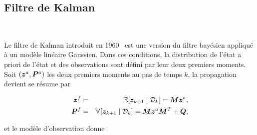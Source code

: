 



\subsection{Filtre de Kalman}~\label{kalman_filter}

Le filtre de Kalman introduit en 1960~\cite{kalman_new_1960} est une version du filtre bayésien appliqué à un modèle linéaire Gaussien. Dans ces conditions, la distribution de l'état a priori de l'état et des observations sont défini par leur deux premiers moments. Soit $(\bm z^a,\bm  P^a)$ les deux premiers moments au pas de temps $k$, la propagation devient se résume par

\begin{eqnarray*}
    \bm z^f &=& \mathbb{E} [\bm z_{k+1} \mid \mathcal D_k] = \bm M \bm z^a,\\
    \bm  P^f &=& \mathbb{V} [\bm z_{k+1} \mid \mathcal D_k] = \bm M \bm z^a \bm M^T + \bm Q,
\end{eqnarray*}

et le modèle d'observation donne


